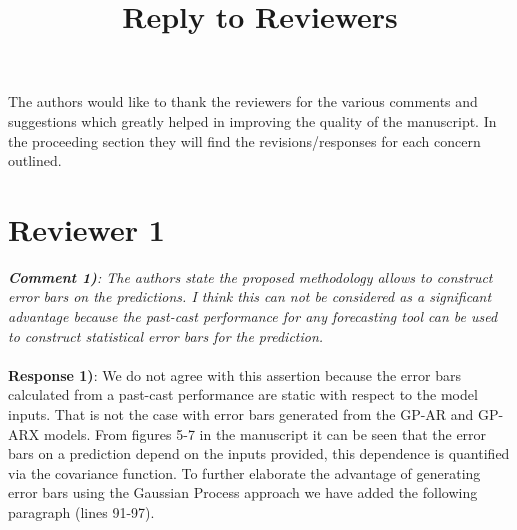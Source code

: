 \documentclass{article}
\begin{document}
\title{Reply to Reviewers}
\maketitle

The authors would like to thank the reviewers for the various comments and suggestions which greatly helped in improving the quality of the manuscript. 
In the proceeding section they will find the revisions/responses for each concern outlined.

\section*{Reviewer 1}

\textit{
\textbf{Comment 1)}: The authors state the proposed methodology allows to construct error bars on the predictions. I think this can not be considered as a significant advantage because the past-cast performance for any forecasting tool can be used to construct statistical error bars for the prediction.}\\
\\
\textbf{Response 1)}: We do not agree with this assertion because the error bars calculated from a past-cast performance are static with respect to the model inputs. That is not the case with error bars generated from the GP-AR and GP-ARX models. From figures 5-7 in the manuscript it can be seen that the error bars on a prediction depend on the inputs provided, this dependence is quantified via the covariance function. To further elaborate the advantage of generating error bars using the Gaussian Process approach we have added the following paragraph (lines 91-97).\\
\\
\\
\\
\end{document}
